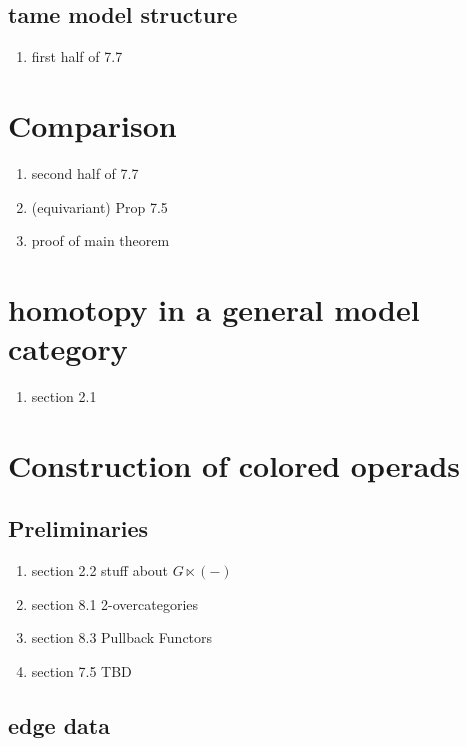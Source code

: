 \documentclass[a4paper,10pt
]{article}%
\renewcommand{\1}{\ensuremath{\mathbb{id}}}
\begin{document}
\subsection{tame model structure}

\begin{enumerate}
\item first half of 7.7
\end{enumerate}


\section{Comparison}

\begin{enumerate}
\item second half of 7.7
\item (equivariant) Prop 7.5
\item proof of main theorem
\end{enumerate}



\appendix

\section{homotopy in a general model category}

\begin{enumerate}
\item section 2.1
\end{enumerate}


\section{Construction of colored operads}

\subsection{Preliminaries}

\begin{enumerate}
\item section 2.2 stuff about $G \ltimes (-)$
\item section 8.1 2-overcategories
\item section 8.3 Pullback Functors
\item section 7.5 TBD
\end{enumerate}

\subsection{edge data}
\end{document}
